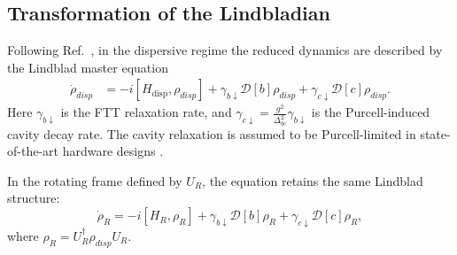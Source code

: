 \subsection{Transformation of the Lindbladian}
\label{subsec:Lindblad_transfer}

Following Ref.~\cite{Blais2021}, in the dispersive regime the reduced dynamics are described by the Lindblad master equation
\begin{align}
\label{eq:Linblad_disp}
    \dot{ \rho}_\textit{disp} &= -i[H_{\text{disp}},  \rho_\textit{disp}] + \gamma_{b\downarrow} \mathcal{D}[b] \rho_\textit{disp} + \gamma_{c\downarrow} \mathcal{D}[c]  \rho_\textit{disp}.
\end{align}
Here $\gamma_{b\downarrow}$ is the FTT relaxation rate, and $\gamma_{c\downarrow}=\frac{g^2}{\Delta_{bc}^2}\gamma_{b\downarrow}$ is the Purcell-induced cavity decay rate. The cavity relaxation is assumed to be Purcell-limited in state-of-the-art hardware designs \cite{longcoherence5}.

In the rotating frame defined by $U_R$, the equation retains the same Lindblad structure:
\begin{equation}
\label{eq:LinbladR}
    \dot{\rho}_R = -i[H_R, \rho_R] + \gamma_{b\downarrow} \mathcal{D}[b]\rho_R + \gamma_{c\downarrow} \mathcal{D}[c]\rho_R,
\end{equation}
where ${\rho}_R = U_R^\dagger \rho_\textit{disp}U_R$.

